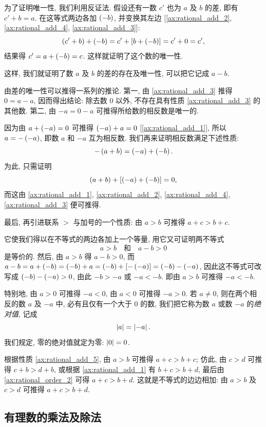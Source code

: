     为了证明唯一性, 我们利用反证法.
    假设还有一数 $c'$ 也为 $a$ 及 $b$ 的差, 即有 $c' + b = a$.
    在这等式两边各加 $\left( -b \right)$, 并变换其左边 [\ref{ax:rational_add_2}, \ref{ax:rational_add_4}, \ref{ax:rational_add_3}]:
    $$
    \left( c' + b \right) + \left( -b \right) = c' + \left[ b + \left( -b \right) \right] = c' + 0 = c',
    $$
    结果得 $c' = a + \left( -b \right) = c$.
    这样就证明了这个数的唯一性.

    这样, 我们就证明了数 $a$ 及 $b$ 的差的存在及唯一性, 可以把它记成 $a - b$.

由差的唯一性可以推得一系列的推论.
第一, 由 \ref{ax:rational_add_3} 推得 $0 = a - a$, 因而得出结论:
除去数 $0$ 以外, 不存在具有性质 \ref{ax:rational_add_3} 的其他数.
第二, 由 $-a = 0 - a$ 可推得所给数的相反数是唯一的.

因为由 $a + \left( -a \right) = 0$ 可推得 $\left( -a \right) + a = 0$ [\ref{ax:rational_add_1}],
所以 $a = -\left( -a \right)$, 即数 $a$ 和 $-a$ 互为相反数.
我们再来证明相反数满足下述性质:
$$
-\left( a + b \right) = \left( -a \right) + \left( -b \right).
$$
为此, 只需证明
$$
\left( a + b \right) + \left[ \left( -a \right) + \left( -b \right) \right] = 0,
$$
而这由 \ref{ax:rational_add_1}, \ref{ax:rational_add_2}, \ref{ax:rational_add_4}, \ref{ax:rational_add_3} 便可推得.

最后, 再引进联系 $>$ 与加号的一个性质:
{\kaishu
    \label{ax:rational_add_5} 由 $a > b$ 可推得 $a + c > b + c$.
}

它使我们得以在不等式的两边各加上一个等量, 用它又可证明两不等式
$$
a > b \quad \text{和} \quad a - b > 0
$$
是等价的.
然后, 由 $a > b$ 得 $a - b > 0$, 而
$a - b = a + \left( -b \right) = \left( -b \right) + a = \left( -b \right) + \left[ -\left( -a \right) \right] = \left( -b \right) - \left( -a \right)$,
因此这不等式可改写成 $\left( -b \right) - \left( -a \right) > 0$, 由此 $-b > -a$ 或 $-a < -b$.
即{\kaishu 由 $a > b$ 可推得 $-a < -b$}.

特别地, 由 $a > 0$ 可推得 $-a < 0$, 由 $a < 0$ 可推得 $-a > 0$.
若 $a \neq 0$, 则在两个相反的数 $a$ 及 $-a$ 中, 必有且仅有一个大于 $0$ 的数, 我们把它称为数 $a$ 或数 $-a$ 的\emph{绝对值}, 记成
$$
\left| a \right| = \left| -a \right|.
$$
我们规定, 零的绝对值就定为零: $\left| 0 \right| = 0$.

根据性质 \ref{ax:rational_add_5}, 由 $a > b$ 可推得 $a + c > b + c$;
仿此, 由 $c > d$ 可推得 $c + b > d + b$, 或根据 \ref{ax:rational_add_1} 有 $b + c > b + d$,
最后由 \ref{ax:rational_order_2} 可得 $a + c > b + d$.
这就是不等式的边边相加: {\kaishu 由 $a > b$ 及 $c > d$ 可推得 $a + c > b + d$}.

\subsection{有理数的乘法及除法} \label{subsec:4}

